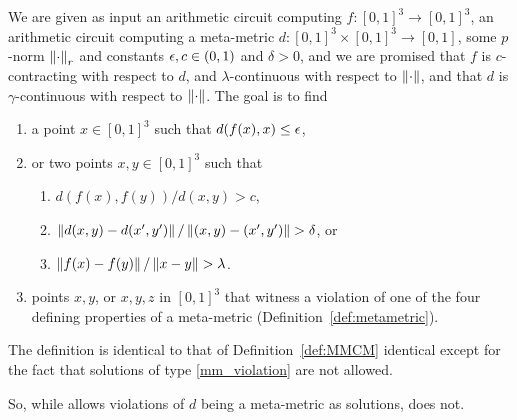 \begin{definition}[\MMCM]
\label{def:MMCM}
We are given as input an arithmetic circuit computing $f: [0,1]^3\to [0,1]^3$,
an arithmetic circuit computing a meta-metric $d : [0,1]^3\times [0,1]^3 \to
[0,1]$, some $p$-norm $\left\| \cdot \right\|_r$ and constants \mbox{$\epsilon,c \in (0,1)$}
and $\delta > 0$, and we are promised that $f$ is $c$-contracting with
respect to $d$, and $\lambda$-continuous with respect to $\left\| \cdot \right\|$, and
that $d$ is $\gamma$-continuous with respect to $\left\| \cdot \right\|$. The goal is
to find
\begin{enumerate}[label=(M\arabic*)]
\item a point $x\in [0,1]^3$ such that $d(f(x),x) \leq \epsilon$, \label{m_fixpoint}
\item or two points $x,y\in [0,1]^3$ such that \label{m_violation}
  \begin{enumerate}[label=(M\arabic{enumi}\alph*)]
    \item $d(f(x),f(y))/d(x,y) > c$, \label{m_not_contracting}
    \item $\left\| d(x,y) - d(x',y') \right\|/\left\| (x,y)-(x',y') \right\| > \delta$, or \label{m_bad_metametric}
    \item $\left\| f(x) - f(y) \right\|/\left\| x-y \right\| > \lambda$. \label{m_bad_f}
  \end{enumerate}
\item points $x,y$, or $x,y,z$ in $[0,1]^3$ that witness a violation of one 
	of the four defining properties of a meta-metric (Definition~\ref{def:metametric}). \label{mm_violation}
\end{enumerate}
\end{definition}

\begin{definition}[\GCM]
\label{def:GCM}
The definition is identical to that of Definition~\ref{def:MMCM} identical except for the fact that 
solutions of type \ref{mm_violation} are not allowed.
\end{definition}

So, while \MMCM allows violations of $d$ being a meta-metric
as solutions, \GCM does not. 

